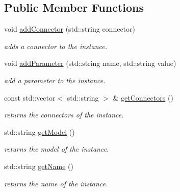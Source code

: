 \subsection*{Public Member Functions}
\begin{DoxyCompactItemize}
\item 
void \hyperlink{class_s_p_i_c_e_1_1_instance_af9aeca34e780851a2b024df7c5ff5b54}{add\+Connector} (std\+::string connector)
\begin{DoxyCompactList}\small\item\em adds a connector to the instance. \end{DoxyCompactList}\item 
void \hyperlink{class_s_p_i_c_e_1_1_instance_a8d69bbbea5ece0949e100c464e412f20}{add\+Parameter} (std\+::string name, std\+::string value)
\begin{DoxyCompactList}\small\item\em add a parameter to the instance. \end{DoxyCompactList}\item 
\mbox{\label{class_s_p_i_c_e_1_1_instance_acce8940edeaa3d79c522006f987e0711}} 
const std\+::vector$<$ std\+::string $>$ \& \hyperlink{class_s_p_i_c_e_1_1_instance_acce8940edeaa3d79c522006f987e0711}{get\+Connectors} ()
\begin{DoxyCompactList}\small\item\em returns the connectors of the instance. \end{DoxyCompactList}\item 
\mbox{\label{class_s_p_i_c_e_1_1_instance_afc74cbe93df9c473a53db83a325f8f9d}} 
std\+::string \hyperlink{class_s_p_i_c_e_1_1_instance_afc74cbe93df9c473a53db83a325f8f9d}{get\+Model} ()
\begin{DoxyCompactList}\small\item\em returns the model of the instance. \end{DoxyCompactList}\item 
\mbox{\label{class_s_p_i_c_e_1_1_instance_ac0fc966d4386ddb71d99361e3fccb311}} 
std\+::string \hyperlink{class_s_p_i_c_e_1_1_instance_ac0fc966d4386ddb71d99361e3fccb311}{get\+Name} ()
\begin{DoxyCompactList}\small\item\em returns the name of the instance. \end{DoxyCompactList}\item 

\end{DoxyCompactItemize}
